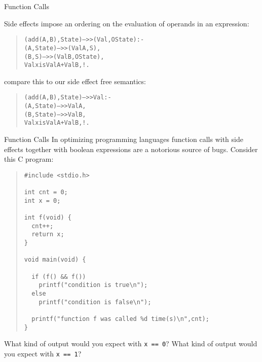\documentclass{beamer}
\begin{document}
\begin{frame}[fragile]{Function Calls}
\scriptsize

Side effects impose an ordering on the evaluation of operands in an expression:
\begin{quote}
\begin{alltt}\tiny
(add(A,B),State) -->> (Val,OState) :-      % addition
     (A,State) -->> (ValA,S),
     (B,S) -->> (ValB,OState),
     Val xis ValA + ValB,!.
\end{alltt}
\end{quote}
compare this to our side effect free semantics:
\begin{quote}
\begin{alltt}\tiny
(add(A,B),State) -->> Val :-       % addition
     (A,State) -->> ValA,
     (B,State) -->> ValB,
     Val xis ValA + ValB,!.
\end{alltt}
\end{quote}
\end{frame}

\begin{frame}[fragile]{Function Calls}
\scriptsize
In optimizing programming languages function calls with side effects together with boolean expressions are a notorious
source of bugs.  Consider this C program:
\begin{quote}\tiny
\begin{verbatim}
#include <stdio.h>

int cnt = 0;
int x = 0;

int f(void) {
  cnt++;
  return x;
}

void main(void) {

  if (f() && f())
    printf("condition is true\n");
  else
    printf("condition is false\n");

  printf("function f was called %d time(s)\n",cnt);
}
\end{verbatim}
\end{quote}
What kind of output would you expect with {\tt x == 0}?  What kind of output would you expect
with {\tt x == 1}?

\end{frame}
\end{document}
